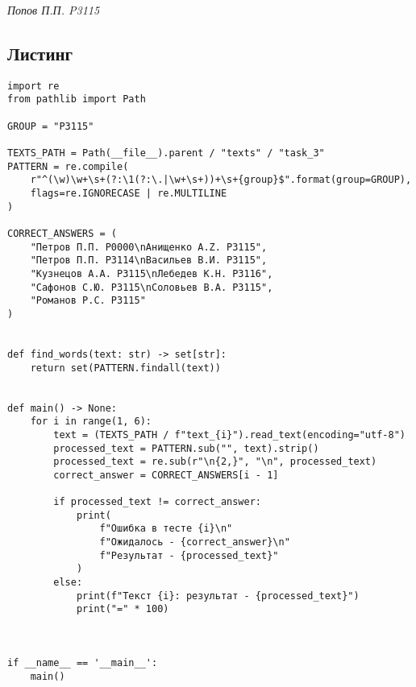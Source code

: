 \textit{Попов П.П. P3115}

\subsection*{Листинг}
\begin{verbatim}
import re
from pathlib import Path

GROUP = "P3115"

TEXTS_PATH = Path(__file__).parent / "texts" / "task_3"
PATTERN = re.compile(
    r"^(\w)\w+\s+(?:\1(?:\.|\w+\s+))+\s+{group}$".format(group=GROUP),
    flags=re.IGNORECASE | re.MULTILINE
)

CORRECT_ANSWERS = (
    "Петров П.П. P0000\nАнищенко А.Z. P3115",
    "Петров П.П. P3114\nВасильев В.И. P3115",
    "Кузнецов А.А. P3115\nЛебедев К.Н. P3116",
    "Сафонов С.Ю. P3115\nСоловьев В.А. P3115",
    "Романов Р.С. P3115"
)


def find_words(text: str) -> set[str]:
    return set(PATTERN.findall(text))


def main() -> None:
    for i in range(1, 6):
        text = (TEXTS_PATH / f"text_{i}").read_text(encoding="utf-8")
        processed_text = PATTERN.sub("", text).strip()
        processed_text = re.sub(r"\n{2,}", "\n", processed_text)
        correct_answer = CORRECT_ANSWERS[i - 1]

        if processed_text != correct_answer:
            print(
                f"Ошибка в тесте {i}\n"
                f"Ожидалось - {correct_answer}\n"
                f"Результат - {processed_text}"
            )
        else:
            print(f"Текст {i}: результат - {processed_text}")
            print("=" * 100)



if __name__ == '__main__':
    main()
\end{verbatim}

